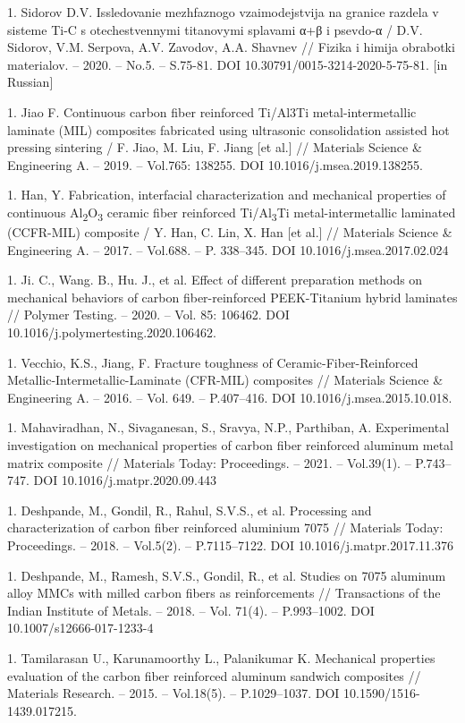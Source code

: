 1. Sidorov D.V. Issledovanie mezhfaznogo vzaimodejstvija na granice
razdela v sisteme Ti-C s otechestvennymi titanovymi splavami α+β i
psevdo-α / D.V. Sidorov, V.M. Serpova, A.V. Zavodov, A.A. Shavnev //
Fizika i himija obrabotki materialov. -- 2020. -- No.5. -- S.75-81.
DOI 10.30791/0015-3214-2020-5-75-81. {[}in Russian{]}

1. Jiao F. Continuous carbon fiber reinforced Ti/Al3Ti
metal-intermetallic laminate (MIL) composites fabricated using
ultrasonic consolidation assisted hot pressing sintering / F. Jiao, M.
Liu, F. Jiang {[}et al.{]} // Materials Science \& Engineering A. --
2019. -- Vol.765: 138255. DOI 10.1016/j.msea.2019.138255.

1. Han, Y. Fabrication, interfacial characterization and mechanical
properties of continuous Al\textsubscript{2}O\textsubscript{3} ceramic
fiber reinforced Ti/Al\textsubscript{3}Ti metal-intermetallic
laminated (CCFR-MIL) composite / Y. Han, C. Lin, X. Han {[}et al.{]}
// Materials Science \& Engineering A. -- 2017. -- Vol.688. -- P.
338--345. DOI 10.1016/j.msea.2017.02.024

1. Ji. C., Wang. B., Hu. J., et al. Effect of different preparation
methods on mechanical behaviors of carbon fiber-reinforced
PEEK-Titanium hybrid laminates // Polymer Testing. -- 2020. -- Vol.
85: 106462. DOI 10.1016/j.polymertesting.2020.106462.

1. Vecchio, K.S., Jiang, F. Fracture toughness of
Ceramic-Fiber-Reinforced Metallic-Intermetallic-Laminate (CFR-MIL)
composites // Materials Science \& Engineering A. -- 2016. -- Vol.
649. -- P.407--416. DOI 10.1016/j.msea.2015.10.018.

1. Mahaviradhan, N., Sivaganesan, S., Sravya, N.P., Parthiban, A.
Experimental investigation on mechanical properties of carbon fiber
reinforced aluminum metal matrix composite // Materials Today:
Proceedings. -- 2021. -- Vol.39(1). -- P.743--747. DOI
10.1016/j.matpr.2020.09.443

1. Deshpande, M., Gondil, R., Rahul, S.V.S., et al. Processing and
characterization of carbon fiber reinforced aluminium 7075 //
Materials Today: Proceedings. -- 2018. -- Vol.5(2). -- P.7115--7122.
DOI 10.1016/j.matpr.2017.11.376

1. Deshpande, M., Ramesh, S.V.S., Gondil, R., et al. Studies on 7075
aluminum alloy MMCs with milled carbon fibers as reinforcements //
Transactions of the Indian Institute of Metals. -- 2018. -- Vol.
71(4). -- P.993--1002. DOI 10.1007/s12666-017-1233-4

1. Tamilarasan U., Karunamoorthy L., Palanikumar K. Mechanical properties
evaluation of the carbon fiber reinforced aluminum sandwich composites
// Materials Research. -- 2015. -- Vol.18(5). -- P.1029--1037. DOI
10.1590/1516-1439.017215.

